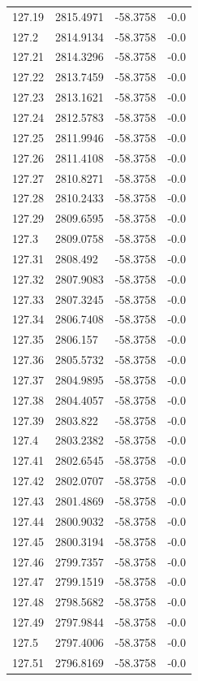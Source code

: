 \begin{table}[H]
\begin{tabular}{llll}
127.19 & 2815.4971 & -58.3758 & -0.0 \\
127.2 & 2814.9134 & -58.3758 & -0.0 \\
127.21 & 2814.3296 & -58.3758 & -0.0 \\
127.22 & 2813.7459 & -58.3758 & -0.0 \\
127.23 & 2813.1621 & -58.3758 & -0.0 \\
127.24 & 2812.5783 & -58.3758 & -0.0 \\
127.25 & 2811.9946 & -58.3758 & -0.0 \\
127.26 & 2811.4108 & -58.3758 & -0.0 \\
127.27 & 2810.8271 & -58.3758 & -0.0 \\
127.28 & 2810.2433 & -58.3758 & -0.0 \\
127.29 & 2809.6595 & -58.3758 & -0.0 \\
127.3 & 2809.0758 & -58.3758 & -0.0 \\
127.31 & 2808.492 & -58.3758 & -0.0 \\
127.32 & 2807.9083 & -58.3758 & -0.0 \\
127.33 & 2807.3245 & -58.3758 & -0.0 \\
127.34 & 2806.7408 & -58.3758 & -0.0 \\
127.35 & 2806.157 & -58.3758 & -0.0 \\
127.36 & 2805.5732 & -58.3758 & -0.0 \\
127.37 & 2804.9895 & -58.3758 & -0.0 \\
127.38 & 2804.4057 & -58.3758 & -0.0 \\
127.39 & 2803.822 & -58.3758 & -0.0 \\
127.4 & 2803.2382 & -58.3758 & -0.0 \\
127.41 & 2802.6545 & -58.3758 & -0.0 \\
127.42 & 2802.0707 & -58.3758 & -0.0 \\
127.43 & 2801.4869 & -58.3758 & -0.0 \\
127.44 & 2800.9032 & -58.3758 & -0.0 \\
127.45 & 2800.3194 & -58.3758 & -0.0 \\
127.46 & 2799.7357 & -58.3758 & -0.0 \\
127.47 & 2799.1519 & -58.3758 & -0.0 \\
127.48 & 2798.5682 & -58.3758 & -0.0 \\
127.49 & 2797.9844 & -58.3758 & -0.0 \\
127.5 & 2797.4006 & -58.3758 & -0.0 \\
127.51 & 2796.8169 & -58.3758 & -0.0 \\

\end{tabular}
\end{table}
